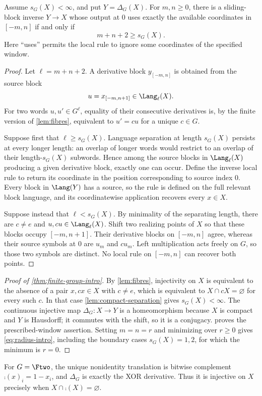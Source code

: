 \begin{proposition}\label{prop:window}
Assume $s_G(X)<\infty$, and put $Y=\Delta_G(X)$.  For $m,n\geq0$, there is a
sliding-block inverse $Y\to X$ whose output at $0$ uses exactly the available
coordinates in $[-m,n]$ if and only if
\[
 m+n+2\geq s_G(X).
\]
Here ``uses'' permits the local rule to ignore some coordinates of the
specified window.
\end{proposition}

\begin{proof}
Let $\ell=m+n+2$.  A derivative block
$y_{[-m,n]}$ is obtained from the source block
\[
 u=x_{[-m,n+1]}\in\Lang_\ell(X).
\]
For two words $u,u'\in G^\ell$, equality of their consecutive derivatives is,
by the finite version of \cref{lem:fibres}, equivalent to $u'=cu$ for a unique
$c\in G$.

Suppose first that $\ell\geq s_G(X)$.  Language separation at length
$s_G(X)$ persists at every longer length: an overlap of longer words would
restrict to an overlap of their length-$s_G(X)$ subwords.  Hence among the
source blocks in $\Lang_\ell(X)$ producing a given derivative block, exactly
one can occur.  Define the inverse local rule to return its coordinate in the
position corresponding to source index $0$.  Every block in $\Lang(Y)$ has a
source, so the rule is defined on the full relevant block language, and its
coordinatewise application recovers every $x\in X$.

Suppose instead that $\ell<s_G(X)$.  By minimality of the separating length,
there are $c\neq e$ and $u,cu\in\Lang_\ell(X)$.  Shift two realizing points of
$X$ so that these blocks occupy $[-m,n+1]$.  Their derivative blocks on
$[-m,n]$ agree, whereas their source symbols at $0$ are $u_m$ and $cu_m$.
Left multiplication acts freely on $G$, so those two symbols are distinct.
No local rule on $[-m,n]$ can recover both points.
\end{proof}

\begin{proof}[Proof of \cref{thm:finite-group-intro}]
By \cref{lem:fibres}, injectivity on $X$ is equivalent to the absence of a
pair $x,cx\in X$ with $c\neq e$, which is equivalent to
$X\cap cX=\varnothing$ for every such $c$.  In that case
\cref{lem:compact-separation} gives $s_G(X)<\infty$.  The continuous
injective map $\Delta_G:X\to Y$ is a homeomorphism because $X$ is compact and
$Y$ is Hausdorff; it commutes with the shift, so it is a conjugacy.
 proves the prescribed-window assertion.  Setting $m=n=r$
and minimizing over $r\geq0$ gives \eqref{eq:radius-intro}, including the
boundary cases $s_G(X)=1,2$, for which the minimum is $r=0$.
\end{proof}

\begin{remark}\label{rem:binary}
For $G=\Ftwo$, the unique nonidentity translation is bitwise complement
$\comp(x)_i=1-x_i$, and $\Delta_G$ is exactly the XOR derivative.  Thus it is
injective on $X$ precisely when $X\cap\comp(X)=\varnothing$.
\end{remark}
